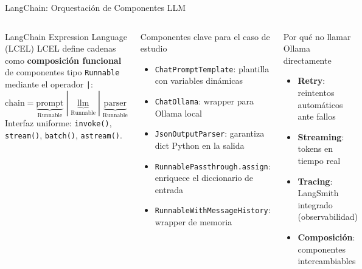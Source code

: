 \documentclass[aspectratio=169]{beamer}
\begin{document}
\begin{frame}{LangChain: Orquestación de Componentes LLM}
  \begin{columns}
    \begin{block}{LangChain Expression Language (LCEL)}
      LCEL define cadenas como \textbf{composición funcional} de
      componentes tipo \texttt{Runnable} mediante el operador \texttt{|}:
      \vspace{0.3em}
      \[
        \text{chain} = \underbrace{\text{prompt}}_{\text{Runnable}} \;|\;
                       \underbrace{\text{llm}}_{\text{Runnable}} \;|\;
                       \underbrace{\text{parser}}_{\text{Runnable}}
      \]
      \vspace{0.1em}
      Interfaz uniforme: \texttt{invoke()}, \texttt{stream()}, \texttt{batch()},
      \texttt{astream()}.
    \end{block}
    \vspace{0.3em}
    \begin{block}{Componentes clave para el caso de estudio}
      \begin{itemize}
        \item \texttt{ChatPromptTemplate}: plantilla con variables dinámicas
        \item \texttt{ChatOllama}: wrapper para Ollama local
        \item \texttt{JsonOutputParser}: garantiza dict Python en la salida
        \item \texttt{RunnablePassthrough.assign}: enriquece el diccionario de entrada
        \item \texttt{RunnableWithMessageHistory}: wrapper de memoria
      \end{itemize}
    \end{block}
    \begin{exampleblock}{Por qué no llamar Ollama directamente}
      \begin{itemize}
        \item \textbf{Retry}: reintentos automáticos ante fallos
        \item \textbf{Streaming}: tokens en tiempo real
        \item \textbf{Tracing}: LangSmith integrado (observabilidad)
        \item \textbf{Composición}: componentes intercambiables

\end{itemize}
\end{exampleblock}
\end{columns}
\end{frame}
\end{document}
